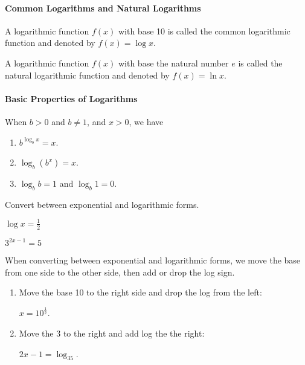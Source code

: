 \paragraph*{Common Logarithms and Natural Logarithms}
	A logarithmic function $f(x)$ with base 10 is called the common logarithmic function and denoted by $f(x)=\log x$.

	A logarithmic function $f(x)$ with base the natural number $e$ is called the natural logarithmic function and denoted by $f(x)=\ln x$.

	\paragraph*{Basic Properties of Logarithms}
	When $b>0$ and $b\neq 1$, and $x>0$, we have
	\begin{enumerate}
		\item $b^{\log_bx}=x$.
		\item $\log_b(b^x)=x$.
		\item $\log_bb=1$ and $\log_b1=0$.
	\end{enumerate}

	\begin{example}
		Convert between exponential and logarithmic forms.\\
		\begin{enumerate*}[label={(\arabic*)~}]
			\item $\log x=\frac{1}{2}$
			\item $3^{2x-1}=5$\hfill\null
		\end{enumerate*}
	\end{example}
	\begin{solution} When converting between exponential and logarithmic forms, we move the base from one side to the other side, then add or drop the log sign.
		\begin{enumerate}[label={(\arabic*)~}]
			\item Move the base 10 to the right side and drop the log from the left:\\
			      \centerline{$x=10^{\frac{1}{2}}$.}
			\item Move the 3 to the right and add log the the right:\\
			      \centerline{$2x-1=\log_35$.}
		\end{enumerate}
	\end{solution}


